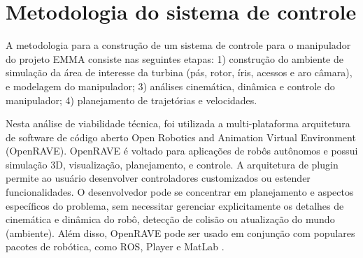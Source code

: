\section{Metodologia do sistema de controle}
A metodologia para a construção de um sistema de controle para o manipulador do
projeto EMMA consiste nas seguintes etapas: 1) construção do ambiente de
simulação da área de interesse da turbina (pás, rotor, íris, acessos e aro
câmara), e modelagem do manipulador; 3) análises cinemática, dinâmica e
controle do manipulador; 4) planejamento de trajetórias e velocidades.

Nesta análise de viabilidade técnica, foi utilizada a 
multi-plataforma arquitetura de software de código aberto Open
Robotics and Animation Virtual Environment (OpenRAVE). OpenRAVE é voltado para
aplicações de robôs autônomos e possui simulação 3D, visualização, planejamento,
e controle. A arquitetura de plugin permite ao usuário desenvolver controladores
customizados ou estender funcionalidades. O desenvolvedor pode se
concentrar em planejamento e aspectos específicos do problema, sem necessitar
gerenciar explicitamente os detalhes de cinemática e dinâmica do robô,
detecção de colisão ou atualização do mundo (ambiente). Além disso, OpenRAVE
pode ser usado em conjunção com populares pacotes de robótica, como ROS, Player e MatLab
\cite{diankov2008openrave}. 









